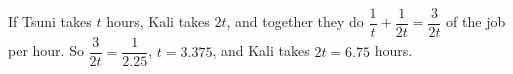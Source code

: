 If Tsuni takes $t$ hours, Kali takes $2t$, and together they do $\dfrac1t+\dfrac1{2t}=\dfrac3{2t}$ of the job per hour. So $\dfrac3{2t}=\dfrac1{2.25}$, $t=3.375$, and Kali takes $2t=\boxed{6.75}$ hours.
